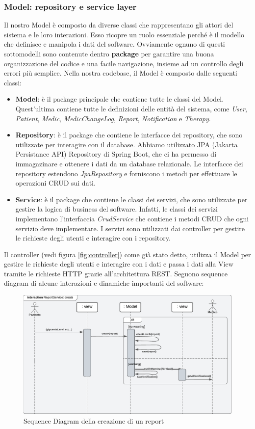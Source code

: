\documentclass[a4paper]{article}
\begin{document}
\subsubsection{Model: repository e service layer}

Il nostro Model è composto da diverse classi che rappresentano gli attori del sistema e le loro interazioni.
Esso ricopre un ruolo essenziale perché è il modello che definisce e manipola i dati del software. 
Ovviamente ognuno di questi sottomodelli sono contenute dentro \textbf{package} per garantire una buona organizzazione del codice e una facile navigazione, insieme
ad un controllo degli errori più semplice.
Nella nostra codebase, il Model è composto dalle seguenti classi:
\begin{itemize}
  \item \textbf{Model}: è il package principale che contiene tutte le classi del Model. Quest'ultima contiene
  tutte le definizioni delle entità del sistema, come \textit{User}, \textit{Patient}, \textit{Medic}, \textit{MedicChangeLog}, \textit{Report}, \textit{Notification} e \textit{Therapy}.
  \item \textbf{Repository}: è il package che contiene le interfacce dei repository, che sono utilizzate per interagire con il database. 
  Abbiamo utilizzato JPA (Jakarta Persistance API) Repository di Spring Boot, che ci ha permesso di immagazinare e ottenere i dati da un 
  database relazionale. 
  Le interfacce dei repository estendono \textit{JpaRepository} e forniscono i metodi per effettuare le operazioni CRUD sui dati.
  \item \textbf{Service}: è il package che contiene le classi dei servizi, che sono utilizzate per gestire la logica di business del software. 
  Infatti, le classi dei servizi implementano l'interfaccia \textit{CrudService} che contiene i metodi CRUD che ogni servizio deve implementare.
  I servizi sono utilizzati dai controller per gestire le richieste degli utenti e interagire con i repository.
\end{itemize}
Il controller (vedi figura \ref{fig:controller}) come già stato detto, utilizza il Model per 
gestire le richieste degli utenti e interagire con i dati e
passa i dati alla View tramite le richieste HTTP grazie all'architettura REST.
Seguono sequence diagram di alcune interazioni e dinamiche importanti del software:
\begin{figure}[H]
  \begin{center}
    \includegraphics[width=1\textwidth]{sdReportCreate.pdf}
  \end{center}
  \caption{Sequence Diagram della creazione di un report} 
\end{figure}
\noindent
\end{document}
